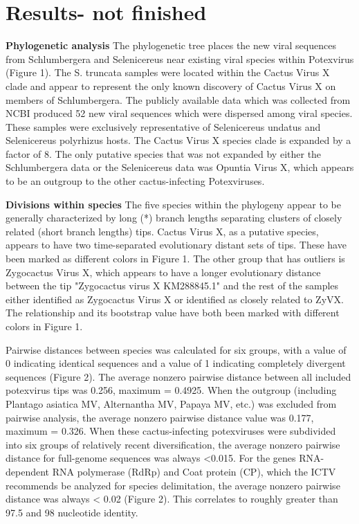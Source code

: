\documentclass{article}
\begin{document}
\section*{Results- not finished}


\textbf{Phylogenetic analysis}
The phylogenetic tree places the new viral sequences from Schlumbergera and Selenicereus near existing viral species within Potexvirus (Figure 1). The S. truncata samples were located within the Cactus Virus X clade and appear to represent the only known discovery of Cactus Virus X on members of Schlumbergera. The publicly available data which was collected from NCBI produced 52 new viral sequences which were dispersed among viral species. These samples were exclusively representative of Selenicereus undatus and Selenicereus polyrhizus hosts. The Cactus Virus X species clade is expanded by a factor of 8. The only putative species that was not expanded by either the Schlumbergera data or the Selenicereus data was Opuntia Virus X, which appears to be an outgroup to the other cactus-infecting Potexviruses. 

\textbf{Divisions within species}
The five species within the phylogeny appear to be generally characterized by long (*) branch lengths separating clusters of closely related (short branch lengths) tips. Cactus Virus X, as a putative species, appears to have two time-separated evolutionary distant sets of tips. These have been marked as different colors in Figure 1. The other group that has outliers is Zygocactus Virus X, which appears to have a longer evolutionary distance between the tip "Zygocactus virus X KM288845.1" and the rest of the samples either identified as Zygocactus Virus X or identified as closely related to ZyVX. The relationship and its bootstrap value have both been marked with different colors in Figure 1. 

Pairwise distances between species was calculated for six groups, with a value of 0 indicating identical sequences and a value of 1 indicating completely divergent sequences (Figure 2). The average nonzero pairwise distance between all included potexvirus tips was 0.256, maximum = 0.4925. When the outgroup (including Plantago asiatica MV, Alternantha MV, Papaya MV, etc.) was excluded from pairwise analysis, the average nonzero pairwise distance value was 0.177, maximum = 0.326. When these cactus-infecting potexviruses were subdivided into six groups of relatively recent diversification, the average nonzero pairwise distance for full-genome sequences was always <0.015. For the genes RNA-dependent RNA polymerase (RdRp) and Coat protein (CP), which the ICTV recommends be analyzed for species delimitation, the average nonzero pairwise distance was always < 0.02 (Figure 2). This correlates to roughly greater than 97.5 and 98 nucleotide identity. 
\end{document}
